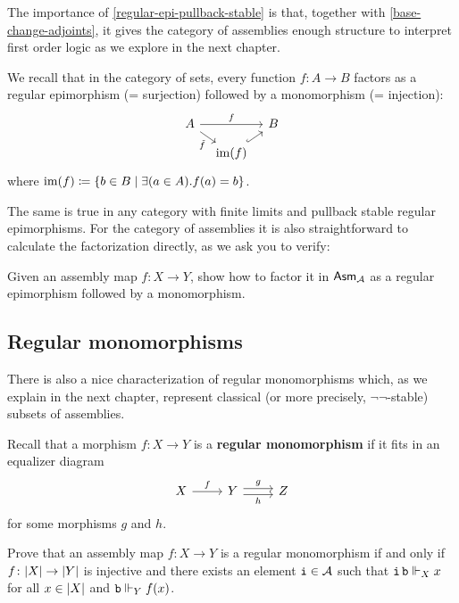 The importance of \cref{regular-epi-pullback-stable} is that, together with
\cref{base-change-adjoints}, it gives the category of assemblies enough
structure to interpret first order logic as we explore in the next chapter.

We recall that in the category of sets, every function \(f \colon A \to B\)
factors as a regular epimorphism (= surjection) followed by a monomorphism (=
injection):
\[
  \begin{tikzcd}[row sep=3mm,column sep=3mm]
    A \ar[dr,"\tilde f"'] \ar[rr,"f"] & & B \\
    & \im(f) \ar[ur,hookrightarrow]
  \end{tikzcd}
\]
where \(\operatorname{im}(f) \coloneq \{b \in B \mid \exists (a \in A).f(a) = b\}\).
%

The same is true in any category with finite limits and pullback stable regular
epimorphisms.
%
For the category of assemblies it is also straightforward to calculate the
factorization directly, as we ask you to verify:

\begin{exercise}\label{exer:reg-epi-mono-factorization}
  Given an assembly map \(f \colon X \to Y\), show how to factor it in
  \(\mathsf{Asm}_{\mathcal A}\) as a regular epimorphism followed by a monomorphism.
\end{exercise}

\subsection{Regular monomorphisms}\label{sec:regular-monos}
There is also a nice characterization of regular monomorphisms which,
as we explain in the next chapter, represent classical (or more precisely,
\(\lnot\lnot\)-stable) subsets of assemblies.

Recall that a morphism \(f \colon X \to Y\) is a \textbf{regular monomorphism}
if it fits in an equalizer diagram
\[
  \begin{tikzcd}
    X \ar[r,"f"]
    & Y \ar[r,shift left, "g"]\ar[r, shift right, "h"']
    & Z
  \end{tikzcd}
\]
for some morphisms \(g\) and \(h\).

\begin{exercise}%
  \label{exer:characterize-regular-monos}
  Prove that an assembly map \(f \colon X \to Y\) is a regular monomorphism if
  and only if \(f \colon \lvert X\rvert \to \lvert Y\rvert\) is injective and there
  exists an element \(\operatorname{\mathtt{i}} \in \mathcal A\) such that
  \(\operatorname{\mathtt{i}}\operatorname{\mathtt{b}} \Vdash_X x\) for all \(x \in \lvert X\rvert\) and
  \(\operatorname{\mathtt{b}} \Vdash_Y f(x)\).
\end{exercise}


